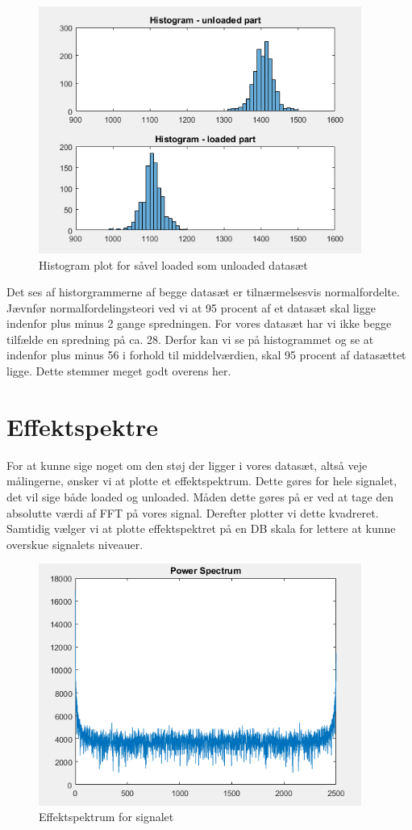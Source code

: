 \begin{figure}[H]
\centering
\includegraphics[width = 300pt]{Img/Histogram.PNG}
\caption{Histogram plot for såvel loaded som unloaded datasæt}
\label{fig:Histogram}
\end{figure}

Det ses af historgrammerne af begge datasæt er tilnærmelsesvis normalfordelte. Jævnfør normalfordelingsteori ved vi at 95 procent af et datasæt skal ligge indenfor plus minus 2 gange spredningen. For vores datasæt har vi ikke begge tilfælde en spredning på ca. 28. Derfor kan vi se på histogrammet og se at indenfor plus minus 56 i forhold til middelværdien, skal 95 procent af datasættet ligge. Dette stemmer meget godt overens her.  
\newpage 

\section{Effektspektre}
For at kunne sige noget om den støj der ligger i vores datasæt, altså veje målingerne, ønsker vi at plotte et effektspektrum. Dette gøres for hele signalet, det vil sige både loaded og unloaded. Måden dette gøres på er ved at tage den absolutte værdi af FFT på vores signal. Derefter plotter vi dette kvadreret. Samtidig vælger vi at plotte effektspektret på en DB skala for lettere at kunne overskue signalets niveauer. 

\begin{figure}[H]
\centering
\includegraphics[width = 300pt]{Img/Effekt.PNG}
\caption{Effektspektrum for signalet}
\label{fig:Effekt}
\end{figure}

